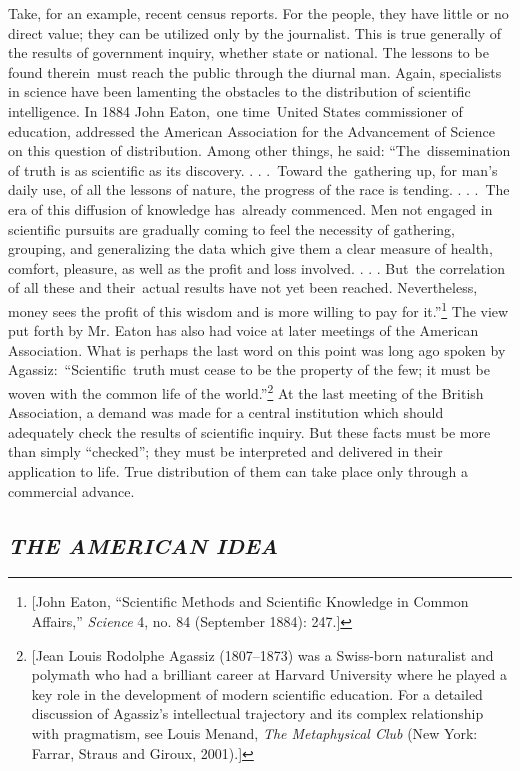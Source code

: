 \documentclass[openany,nobib]{tufte-book}
\begin{document}
Take, for an example, recent census reports. For the people, they have
little or no direct value; they can be utilized only by the journalist.
This is true generally of the results of government inquiry, whether
state or national. The lessons to be found therein~must reach the public
through the diurnal man. Again, specialists in science have been
lamenting the obstacles to the distribution of scientific intelligence.
In 1884 John Eaton,~one time~United States commissioner of education,
addressed the American Association for the Advancement of Science on
this question of distribution. Among other things, he said:
``The~dissemination of truth is as scientific as its discovery. . .
.~Toward the~gathering up, for man's daily use, of all the lessons of
nature, the progress of the race is tending. . . .~The era of this
diffusion of knowledge has~already commenced. Men not engaged in
scientific pursuits are gradually coming to feel the necessity of
gathering, grouping, and generalizing the data which give them a clear
measure of health, comfort, pleasure, as well as the profit and loss
involved. . . . But~the correlation of all these and their~actual
results have not yet been reached. Nevertheless, money sees the profit
of this wisdom and is more willing to pay for it.''\footnote{{[}John
  Eaton, ``Scientific Methods and Scientific Knowledge in Common
  Affairs,'' \emph{Science} 4, no. 84 (September 1884): 247.{]}} The
view put forth by Mr. Eaton has also had voice at later meetings of the
American Association. What is perhaps the last word on this point was
long ago spoken by Agassiz:~``Scientific~truth must cease to be the
property of the few; it must be woven with the common life of the
world.''\footnote{{[}Jean Louis Rodolphe Agassiz (1807--1873) was a
  Swiss-born naturalist and polymath who had a brilliant career at
  Harvard University where he played a key role in the development of
  modern scientific education. For a detailed discussion of Agassiz's
  intellectual trajectory and its complex relationship with pragmatism,
  see Louis Menand, \emph{The Metaphysical Club} (New York: Farrar,
  Straus and Giroux, 2001).{]}} At the last meeting of the British
Association, a demand was made for a central institution which should
adequately check the results of scientific inquiry. But these facts must
be more than simply ``checked''; they must be interpreted and delivered
in their application to life. True distribution of them can take place
only through a commercial advance.~

\hypertarget{the-american-idea}{%
\subsection{\texorpdfstring{\emph{THE AMERICAN
IDEA}}{THE AMERICAN IDEA}}\label{the-american-idea}}
\end{document}
